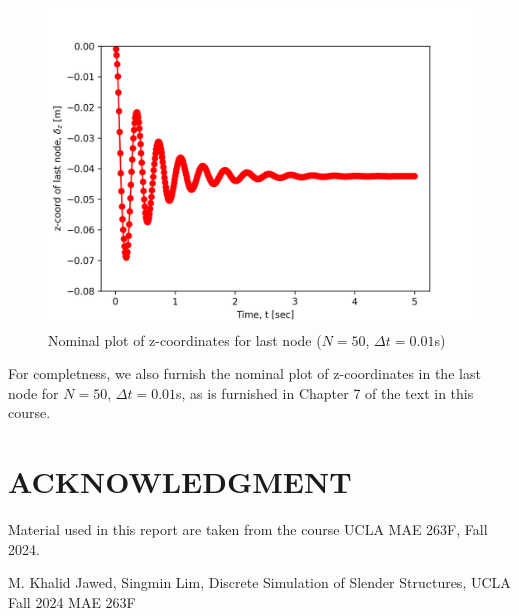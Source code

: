 \documentclass[letterpaper, 10 pt, conference]{ieeeconf}  %
\begin{document}
\begin{figure}[h!]
   \centering
   \includegraphics[width=0.8\linewidth]{../figures/n_50_dt_0-01_z_plot.png}
   \caption{Nominal plot of z-coordinates for last node ($N=50$, $\Delta t = 0.01$s)}
   \label{fig:nominal_zplot}
\end{figure}

For completness, we also furnish the nominal plot of z-coordinates in the last node for $N=50$, $\Delta t = 0.01$s, as is furnished in Chapter 7 of the text in this course.

\section*{ACKNOWLEDGMENT}

Material used in this report are taken from the course UCLA MAE 263F, Fall 2024.




\begin{thebibliography}{99}

 M. Khalid Jawed, Singmin Lim, Discrete Simulation of Slender Structures, UCLA Fall 2024 MAE 263F

\end{thebibliography}
\end{document}
